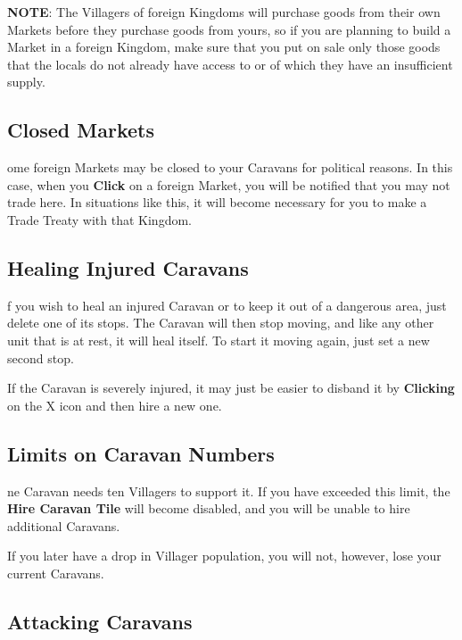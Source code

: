 \textbf{NOTE}: The Villagers of foreign Kingdoms will purchase goods from their own Markets before they purchase goods from yours, so if you are planning to build a Market in a foreign Kingdom, make sure that you put on sale only those goods that the locals do not already have access to or of which they have an insufficient supply.

\subsection{Closed Markets}


ome foreign Markets may be closed to your Caravans for political reasons. In this case, when you \textbf{Click} on a foreign Market, you will be notified that you may not trade here. In situations like this, it will become necessary for you to make a Trade Treaty with that Kingdom.

\subsection{Healing Injured Caravans}


f you wish to heal an injured Caravan or to keep it out of a dangerous area, just delete one of its stops. The Caravan will then stop moving, and like any other unit that is at rest, it will heal itself. To start it moving again, just set a new second stop.

If the Caravan is severely injured, it may just be easier to disband it by \textbf{Clicking} on the X icon and then hire a new one.

\subsection{Limits on Caravan Numbers}


ne Caravan needs ten Villagers to support it. If you have exceeded this limit, the \textbf{Hire Caravan Tile} will become disabled, and you will be unable to hire additional Caravans.

If you later have a drop in Villager population, you will not, however, lose your current Caravans.

\subsection{Attacking Caravans}

